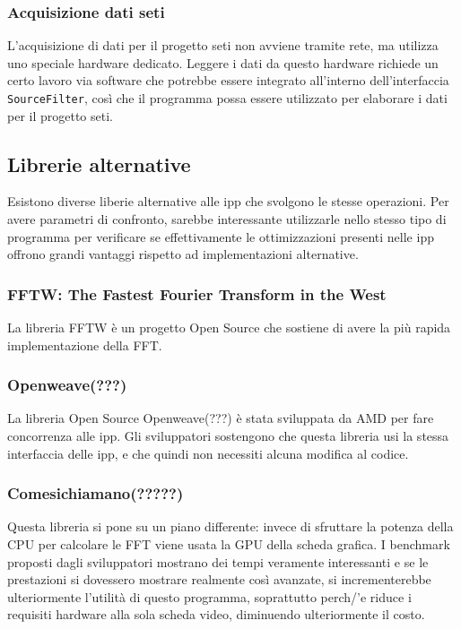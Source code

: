 \subsubsection{Acquisizione dati \ac{seti}}
\label{seti}
L'acquisizione di dati per il progetto \ac{seti} non avviene tramite rete, ma
utilizza uno speciale hardware dedicato. Leggere i dati da questo hardware
richiede un certo lavoro via software che potrebbe essere integrato all'interno
dell'interfaccia \texttt{SourceFilter}, cos\`i che il programma possa essere
utilizzato per elaborare i dati per il progetto \ac{seti}.

\subsection{Librerie alternative}
\label{altlib}

Esistono diverse liberie alternative alle \ac{ipp} che svolgono le stesse
operazioni. Per avere parametri di confronto, sarebbe interessante utilizzarle
nello stesso tipo di programma per verificare se effettivamente le
ottimizzazioni presenti nelle \ac{ipp} offrono grandi vantaggi rispetto ad
implementazioni alternative.

\subsubsection{FFTW: The Fastest Fourier Transform in the West}
La libreria FFTW \`e un progetto Open Source che sostiene di avere la pi\`u
rapida implementazione della \ac{FFT}.

\subsubsection{Openweave(???)}
La libreria Open Source Openweave(???) \`e stata sviluppata da AMD per fare
concorrenza alle \ac{ipp}. Gli sviluppatori sostengono che questa libreria usi
la stessa interfaccia delle \ac{ipp}, e che quindi non necessiti alcuna modifica al
codice. 

\subsubsection{Comesichiamano(?????)}
Questa libreria si pone su un piano differente: invece di sfruttare la potenza
della CPU per calcolare le FFT viene usata la GPU della scheda grafica. I
benchmark proposti dagli sviluppatori mostrano dei tempi veramente interessanti
e se le prestazioni si dovessero mostrare realmente cos\`i avanzate, si
incrementerebbe ulteriormente l'utilit\`a di questo programma, soprattutto
perch/'e riduce i requisiti hardware alla sola scheda video, diminuendo
ulteriormente il costo.

